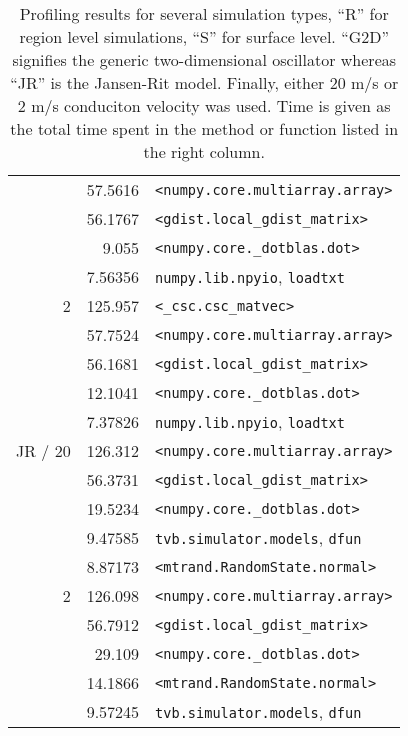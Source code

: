 \begin{table}
{\begin{tabular}{r | r | l }
&         57.5616 & \texttt{<numpy.core.multiarray.array>} \\
 &         56.1767 & \texttt{<gdist.local\_gdist\_matrix>} \\
 &           9.055 & \texttt{<numpy.core.\_dotblas.dot>} \\
 &         7.56356 & \texttt{numpy.lib.npyio}, \texttt{loadtxt} \\
\hline
2 &         125.957 & \texttt{<\_csc.csc\_matvec>} \\
&         57.7524 & \texttt{<numpy.core.multiarray.array>} \\
 &         56.1681 & \texttt{<gdist.local\_gdist\_matrix>} \\
 &         12.1041 & \texttt{<numpy.core.\_dotblas.dot>} \\
 &         7.37826 & \texttt{numpy.lib.npyio}, \texttt{loadtxt} \\
\hline
JR / 20 &         126.312 & \texttt{<numpy.core.multiarray.array>} \\
&         56.3731 & \texttt{<gdist.local\_gdist\_matrix>} \\
 &         19.5234 & \texttt{<numpy.core.\_dotblas.dot>} \\
 &         9.47585 & \texttt{tvb.simulator.models}, \texttt{dfun} \\
 &         8.87173 & \texttt{<mtrand.RandomState.normal>} \\
\hline
2 &         126.098 & \texttt{<numpy.core.multiarray.array>} \\
&         56.7912 & \texttt{<gdist.local\_gdist\_matrix>} \\
 &          29.109 & \texttt{<numpy.core.\_dotblas.dot>} \\
 &         14.1866 & \texttt{<mtrand.RandomState.normal>} \\
 &         9.57245 & \texttt{tvb.simulator.models}, \texttt{dfun} \\
\hline

\end{tabular}}
\caption{Profiling results for several simulation types, ``R'' for region 
level simulations, ``S'' for surface level. ``G2D'' signifies the generic
two-dimensional oscillator whereas ``JR'' is the Jansen-Rit model. Finally,
either 20 m/s or 2 m/s conduciton velocity was used. Time is given as the
total time spent in the method or function listed in the right column.}
\label{tab:profiling}
\end{table}

